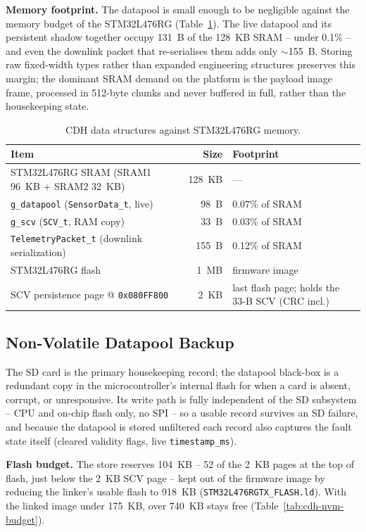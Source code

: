 \textbf{Memory footprint.} The datapool is small enough to be negligible
against the memory budget of the STM32L476RG (Table~\ref{tab:cdh-memory}).
The live datapool and its persistent shadow together occupy 131~B of the
128~KB SRAM -- under 0.1\% -- and even the downlink packet that
re-serialises them adds only $\sim$155~B. Storing raw fixed-width types
rather than expanded engineering structures preserves this margin; the
dominant SRAM demand on the platform is the payload image frame, processed
in 512-byte chunks and never buffered in full, rather than the housekeeping
state.

\begin{table}[H]
\centering
\begin{tabular}{p{6.3cm}rp{6.0cm}}
\toprule
\textbf{Item} & \textbf{Size} & \textbf{Footprint} \\
\midrule
STM32L476RG SRAM (SRAM1 96~KB + SRAM2 32~KB) & 128~KB & --- \\
\texttt{g\_datapool} (\texttt{SensorData\_t}, live) & 98~B & 0.07\% of SRAM \\
\texttt{g\_scv} (\texttt{SCV\_t}, RAM copy) & 33~B & 0.03\% of SRAM \\
\texttt{TelemetryPacket\_t} (downlink serialization) & 155~B & 0.12\% of SRAM \\
\midrule
STM32L476RG flash & 1~MB & firmware image \\
SCV persistence page @ \texttt{0x080FF800} & 2~KB & last flash page; holds the 33-B SCV (CRC incl.) \\
\bottomrule
\end{tabular}
\caption{CDH data structures against STM32L476RG memory.}
\label{tab:cdh-memory}
\end{table}

\subsection{Non-Volatile Datapool Backup}
\label{sec:cdh-nvm}

The SD card is the primary housekeeping record; the datapool black-box is a
redundant copy in the microcontroller's internal flash for when a card is
absent, corrupt, or unresponsive. Its write path is fully independent of the SD
subsystem -- CPU and on-chip flash only, no SPI -- so a usable record survives
an SD failure, and because the datapool is stored unfiltered each record also
captures the fault state itself (cleared validity flags, live
\texttt{timestamp\_ms}).

\textbf{Flash budget.} The store reserves 104~KB -- 52 of the 2~KB pages at the
top of flash, just below the 2~KB SCV page -- kept out of the firmware image by
reducing the linker's usable flash to 918~KB
(\texttt{STM32L476RGTX\_FLASH.ld}). With the linked image under 175~KB, over
740~KB stays free (Table~\ref{tab:cdh-nvm-budget}).

